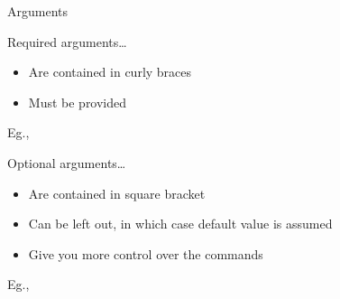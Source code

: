 \documentclass[10pt,times]{beamer}
\begin{document}
\begin{frame}{Arguments}
\begin{block}{Required arguments\ldots}
\begin{itemize}
\item Are contained in curly braces
\item Must be provided
\end{itemize}
Eg., 
\end{block}

\begin{block}{Optional arguments\ldots}
\begin{itemize}
\item Are contained in square bracket
\item Can be left out, in which case default value is assumed
\item Give you more control over the commands
\end{itemize}
Eg., 
\end{block}
\end{frame}
\end{document}
